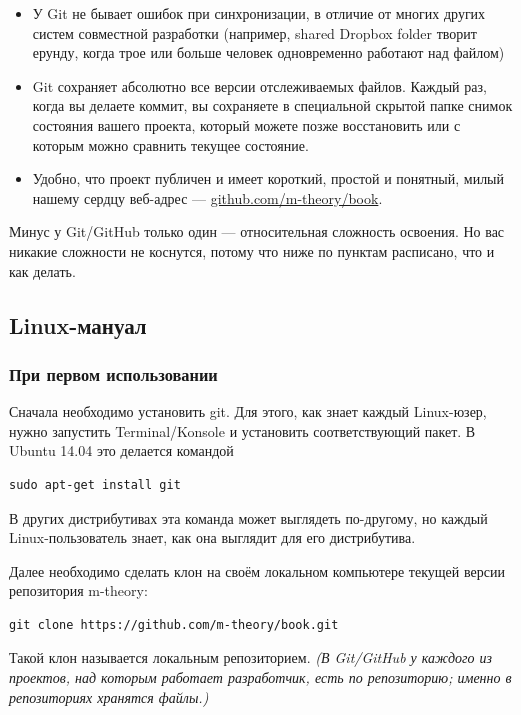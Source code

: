 \documentclass[11pt]{article}
\theoremstyle{remark}
\theoremstyle{definition}
\begin{document}
\begin{itemize}

\item У Git не бывает ошибок при синхронизации, в отличие от многих других систем совместной разработки (например, shared Dropbox folder творит ерунду, когда трое или больше человек одновременно работают над файлом)

\item Git сохраняет абсолютно все версии отслеживаемых файлов. Каждый раз, когда вы делаете коммит, вы сохраняете в специальной скрытой папке снимок состояния вашего проекта, который можете позже восстановить или с которым можно сравнить текущее состояние.

\item Удобно, что проект публичен и имеет короткий, простой и понятный, милый нашему сердцу веб-адрес ---
\href{https://github.com/m-theory/book}{\textcolor[rgb]{0.38,0.69,0.82}{github.com/m-theory/book}}.

\end{itemize}

Минус у Git/GitHub только один --- относительная сложность освоения. Но вас никакие сложности не коснутся, потому что ниже по пунктам расписано, что и как делать.

\subsection{Linux-мануал}

\subsubsection{При первом использовании}


Сначала необходимо установить git. Для этого, как знает каждый Linux-юзер, нужно запустить Terminal/Konsole и установить соответствующий пакет. В Ubuntu 14.04 это делается командой \begin{verbatim}sudo apt-get install git\end{verbatim}
В других дистрибутивах эта команда может выглядеть по-другому, но каждый Linux-пользователь знает, как она выглядит для его дистрибутива.


Далее необходимо сделать клон на своём локальном компьютере текущей версии репозитория m-theory: \begin{verbatim}git clone https://github.com/m-theory/book.git\end{verbatim}
Такой клон называется локальным репозиторием. \textit{(В Git/GitHub у каждого из проектов, над которым работает разработчик, есть по репозиторию; именно в репозиториях хранятся файлы.)}
\end{document}
